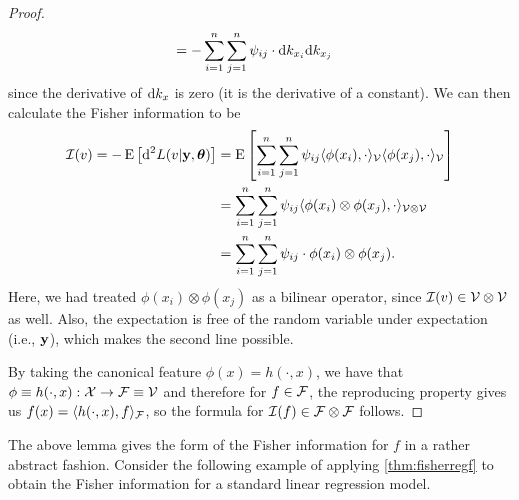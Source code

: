 \begin{proof}
\begin{align*}
		&= - \sum_{i=1}^n\sum_{j=1}^n \psi_{ij} \cdot \text{d} k_{x_i} \text{d} k_{x_j}
	\end{align*}
	since the derivative of $\text{d} k_{x}$ is zero (it is the derivative of a constant).
	We can then calculate the Fisher information to be
	\begin{align*}
		{\mathcal I}(v) = -\operatorname{E} \big[ \text{d}^2 L(v|{\mathbf y},{\bm\theta}) \big] 
		&=\operatorname{E} \left[ \sum_{i=1}^n\sum_{j=1}^n \psi_{ij}  \langle \phi(x_i), \cdot \rangle_{{\mathcal V}} \langle \phi(x_j), \cdot \rangle_{{\mathcal V}} \right] \\
		&= \sum_{i=1}^n\sum_{j=1}^n \psi_{ij}  \langle \phi(x_i) \otimes \phi(x_j), \cdot \rangle_{{\mathcal V}\otimes{\mathcal V}}  \\		
		&=\sum_{i=1}^n\sum_{j=1}^n \psi_{ij} \cdot \phi(x_i) \otimes \phi(x_j).
	\end{align*}	 	
	Here, we had treated $\phi(x_i) \otimes \phi(x_j)$ as a bilinear operator, since ${\mathcal I}(v) \in {\mathcal V} \otimes {\mathcal V}$ as well.
	Also, the expectation is free of the random variable under expectation (i.e., ${\mathbf y}$), which makes the second line possible.
	
	By taking the canonical feature $\phi(x)=h(\cdot,x)$, we have that $\phi \equiv h(\cdot,x):{\mathcal X}\to{\mathcal F} \equiv {\mathcal V}$ and therefore for $f\in{\mathcal F}$, the reproducing property gives us $f(x) = \langle h(\cdot,x),f\rangle_{\mathcal F}$, so the formula for ${\mathcal I}(f) \in {\mathcal F} \otimes {\mathcal F}$ follows.
\end{proof}

The above lemma gives the form of the Fisher information for $f$ in a rather abstract fashion.
Consider the following example of applying \cref{thm:fisherregf} to obtain the Fisher information for a standard linear regression model.

